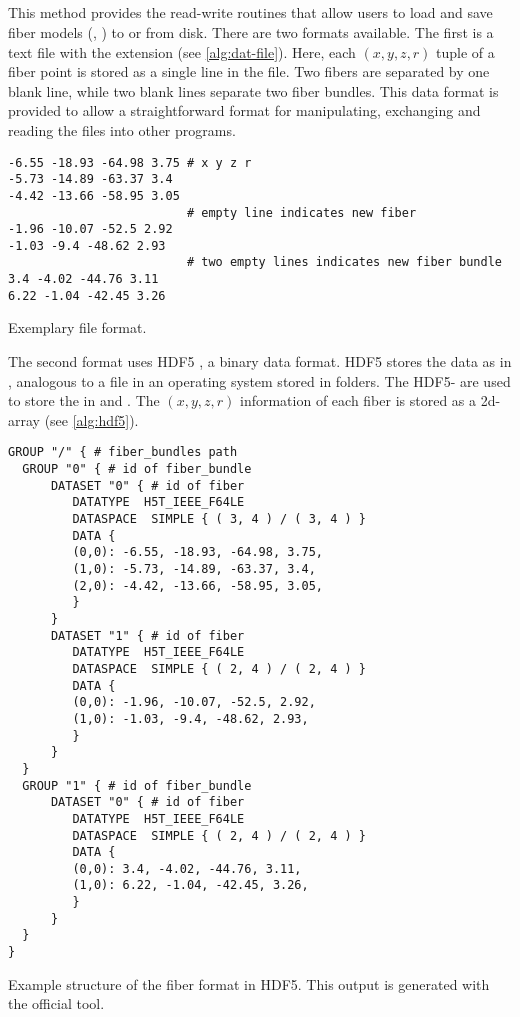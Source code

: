 \subsection{}
%
This method provides the read-write routines that allow users to load and save fiber models (\ie{}, ) to or from disk.
There are two formats available.
The first is a text file with the extension  (see \cref{alg:dat-file}).
Here, each $(x,y,z,r)$ tuple of a fiber point is stored as a single line in the file.
Two fibers are separated by one blank line, while two blank lines separate two fiber bundles.
This data format is provided to allow a straightforward  format for manipulating, exchanging and reading the files into other programs.
\par
%
\begin{lstfloat}[!ht]
\begin{lstlisting}
-6.55 -18.93 -64.98 3.75 # x y z r
-5.73 -14.89 -63.37 3.4
-4.42 -13.66 -58.95 3.05
                         # empty line indicates new fiber
-1.96 -10.07 -52.5 2.92
-1.03 -9.4 -48.62 2.93
                         # two empty lines indicates new fiber bundle
3.4 -4.02 -44.76 3.11
6.22 -1.04 -42.45 3.26
\end{lstlisting}
\caption[]{Exemplary  file format.}\label{alg:dat-file}
\end{lstfloat}
%
The second format uses \ac{HDF5} \cite{hdf5}, a binary data format.
\ac{HDF5} stores the data as  in , analogous to a file in an operating system stored in folders.
The \ac{HDF5}- are used to store the  in  and .
The $(x,y,z,r)$ information of each fiber is stored as a 2d-array (see \cref{alg:hdf5}).
%
\begin{lstfloat}[!ht]
\begin{lstlisting}
GROUP "/" { # fiber_bundles path
  GROUP "0" { # id of fiber_bundle
      DATASET "0" { # id of fiber
         DATATYPE  H5T_IEEE_F64LE
         DATASPACE  SIMPLE { ( 3, 4 ) / ( 3, 4 ) }
         DATA {
         (0,0): -6.55, -18.93, -64.98, 3.75,
         (1,0): -5.73, -14.89, -63.37, 3.4,
         (2,0): -4.42, -13.66, -58.95, 3.05,
         }
      }
      DATASET "1" { # id of fiber
         DATATYPE  H5T_IEEE_F64LE
         DATASPACE  SIMPLE { ( 2, 4 ) / ( 2, 4 ) }
         DATA {
         (0,0): -1.96, -10.07, -52.5, 2.92,
         (1,0): -1.03, -9.4, -48.62, 2.93,
         }
      }
  }
  GROUP "1" { # id of fiber_bundle
      DATASET "0" { # id of fiber
         DATATYPE  H5T_IEEE_F64LE
         DATASPACE  SIMPLE { ( 2, 4 ) / ( 2, 4 ) }
         DATA {
         (0,0): 3.4, -4.02, -44.76, 3.11,
         (1,0): 6.22, -1.04, -42.45, 3.26,
         }
      }
  }
}
\end{lstlisting}
\caption[]{Example structure of the fiber format in \ac{HDF5}. This output is generated with the official  tool.}
\label{alg:hdf5}
\end{lstfloat}
%
%
%
